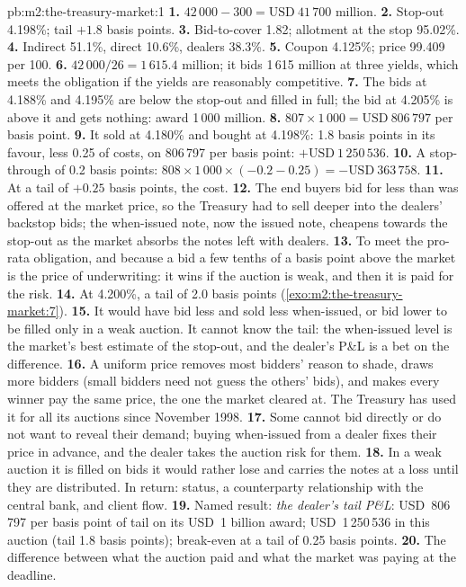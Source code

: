 \begin{solution}{pb:m2:the-treasury-market:1}
\textbf{1.} $42\,000 - 300 = \text{USD}~41\,700$ million.
\textbf{2.} Stop-out 4.198\%; tail $+1.8$ basis points.
\textbf{3.} Bid-to-cover 1.82; allotment at the stop 95.02\%.
\textbf{4.} Indirect 51.1\%, direct 10.6\%, dealers 38.3\%.
\textbf{5.} Coupon 4.125\%; price 99.409 per 100.
\textbf{6.} $42\,000/26 = 1\,615.4$ million; it bids 1\,615 million at three
yields, which meets the obligation if the yields are reasonably competitive.
\textbf{7.} The bids at 4.188\% and 4.195\% are below the stop-out and filled
in full; the bid at 4.205\% is above it and gets nothing: award 1\,000
million.
\textbf{8.} $807 \times 1\,000 = \text{USD}~806\,797$ per basis point.
\textbf{9.} It sold at 4.180\% and bought at 4.198\%: 1.8 basis points in its
favour, less 0.25 of costs, on 806\,797 per basis point: $+\text{USD}~1\,250\,536$.
\textbf{10.} A stop-through of 0.2 basis points: $808 \times 1\,000 \times (-0.2
- 0.25) = -\text{USD}~363\,758$.
\textbf{11.} At a tail of $+0.25$ basis points, the cost.
\textbf{12.} The end buyers bid for less than was offered at the market price,
so the Treasury had to sell deeper into the dealers' backstop bids; the
when-issued note, now the issued note, cheapens towards the stop-out as the
market absorbs the notes left with dealers.
\textbf{13.} To meet the pro-rata obligation, and because a bid a few tenths of
a basis point above the market is the price of underwriting: it wins if the
auction is weak, and then it is paid for the risk.
\textbf{14.} At 4.200\%, a tail of 2.0 basis points (\cref{exo:m2:the-treasury-market:7}).
\textbf{15.} It would have bid less and sold less when-issued, or bid lower
to be filled only in a weak auction. It cannot know the tail: the when-issued
level is the market's best estimate of the stop-out, and the dealer's P\&L
is a bet on the difference.
\textbf{16.} A uniform price removes most bidders' reason to shade, draws more
bidders (small bidders need not guess the others' bids), and makes every
winner pay the same price, the one the market cleared at. The Treasury has
used it for all its auctions since November 1998.
\textbf{17.} Some cannot bid directly or do not want to reveal their demand;
buying when-issued from a dealer fixes their price in advance, and the dealer
takes the auction risk for them.
\textbf{18.} In a weak auction it is filled on bids it would rather lose and
carries the notes at a loss until they are distributed. In return:  status, a counterparty relationship with the central bank, and client
flow.
\textbf{19.} Named result: \emph{the dealer's tail P\&L}: USD~806\,797 per basis
point of tail on its USD~1 billion award; USD~1\,250\,536 in this auction
(tail 1.8 basis points); break-even at a tail of 0.25 basis points.
\textbf{20.} The difference between what the auction paid and what the market
was paying at the deadline.
\end{solution}

